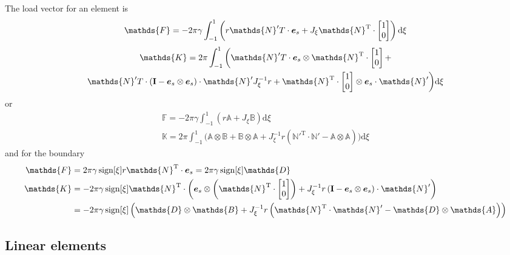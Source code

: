 \documentclass[a4paper,11pt]{article}
\renewcommand{\to}[1]{\text{\boldmath $#1$}} %
\newcommand{\ts}[1]{\text{\boldmath $\mathrm{#1}$}} %
\newcommand{\uv}[1]{\mathds{#1}}
\newcommand{\um}[1]{\mathds{#1}}
\newcommand{\intd}[1]{\mathrm{d}#1}
\newcommand{\T}{\mathrm{T}}
\DeclareMathOperator{\sign}{sign}
\begin{document}
The load vector for an element is
\begin{gather}
 \uv F = -2\pi \gamma \int_{-1}^{1} \left(r{\um N}'^\T\cdot\to e_s + J_\xi{\um N}^\T\cdot\begin{bmatrix}1\\0\end{bmatrix}\right) \intd\xi
\end{gather}
\begin{multline}
 \um K = 2\pi \int_{-1}^{1} \bigg(
	{\um N}'^\T \cdot \to e_s \otimes {\um N}^\T\cdot \begin{bmatrix}1\\0\end{bmatrix} +\\
	{\um N}'^\T \cdot (\ts I - \to e_s\otimes \to e_s)\cdot {\um N}' J_\xi^{-1} r +
	{\um N}^\T \cdot \begin{bmatrix}1\\0\end{bmatrix}\otimes \to e_s\cdot {\um N}'
	\bigg)\intd\xi
\end{multline}
or
\begin{gather}
  \uv F = -2\pi \gamma \int_{-1}^{1} \left(r\uv A + J_\xi\uv B\right) \intd\xi\\
  \um K = 2\pi \int_{-1}^{1} \bigg(
	\uv A \otimes \uv B +
	\uv B\otimes \uv A +
	J_\xi^{-1} r({\um N}'^\T \cdot {\um N}' - \uv A\otimes \uv A)
	\bigg)\intd\xi
\end{gather}
and for the boundary
\begin{align}
 \uv F &= 2\pi\gamma\sign[\xi] r {\uv N}^\T \cdot \to e_s = 2\pi\gamma\sign[\xi]\uv D\\
 \um K &= -2 \pi \gamma \sign[\xi]\um N^\T\cdot\left(\to e_s\otimes\left(\um N^\T\cdot\begin{bmatrix}1\\0\end{bmatrix}\right) + J_\xi^{-1} r \left(\ts I-\to e_s\otimes\to e_s\right)\cdot \um N' \right)\\
       &= -2 \pi \gamma \sign[\xi]\left(\uv D\otimes\uv B + J_\xi^{-1} r \left(\um N^\T\cdot\um N' -\uv D\otimes\uv A\right) \right)
\end{align}

\subsection{Linear elements}
\end{document}
